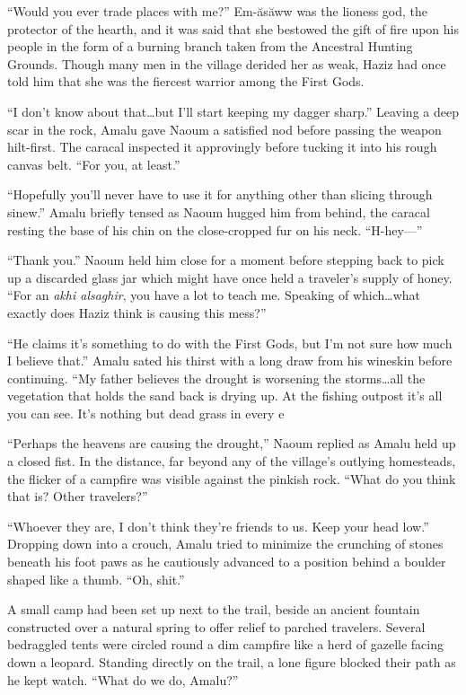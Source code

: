 ``Would you ever trade places with me?'' Em-ăsăww was the lioness god, the protector of the hearth, and it was said that she bestowed the gift of fire upon his people in the form of a burning branch taken from the Ancestral Hunting Grounds. Though many men in the village derided her as weak, Haziz had once told him that she was the fiercest warrior among the First Gods.

``I don't know about that\ldots but I'll start keeping my dagger sharp.'' Leaving a deep scar in the rock, Amalu gave Naoum a satisfied nod before passing the weapon hilt-first. The caracal inspected it approvingly before tucking it into his rough canvas belt. ``For you, at least.''

``Hopefully you'll never have to use it for anything other than slicing through sinew.'' Amalu briefly tensed as Naoum hugged him from behind, the caracal resting the base of his chin on the close-cropped fur on his neck. ``H-hey---''

``Thank you.'' Naoum held him close for a moment before stepping back to pick up a discarded glass jar which might have once held a traveler's supply of honey. ``For an \emph{akhi alsaghir}, you have a lot to teach me. Speaking of which\ldots what exactly does Haziz think is causing this mess?''

``He claims it's something to do with the First Gods, but I'm not sure how much I believe that.'' Amalu sated his thirst with a long draw from his wineskin before continuing. ``My father believes the drought is worsening the storms\ldots all the vegetation that holds the sand back is drying up. At the fishing outpost it's all you can see. It's nothing but dead grass in every e

``Perhaps the heavens are causing the drought,'' Naoum replied as Amalu held up a closed fist. In the distance, far beyond any of the village's outlying homesteads, the flicker of a campfire was visible against the pinkish rock. ``What do you think that is? Other travelers?''

``Whoever they are, I don't think they're friends to us. Keep your head low.'' Dropping down into a crouch, Amalu tried to minimize the crunching of stones beneath his foot paws as he cautiously advanced to a position behind a boulder shaped like a thumb. ``Oh, shit.''

A small camp had been set up next to the trail, beside an ancient fountain constructed over a natural spring to offer relief to parched travelers. Several bedraggled tents were circled round a dim campfire like a herd of gazelle facing down a leopard. Standing directly on the trail, a lone figure blocked their path as he kept watch. ``What do we do, Amalu?''

